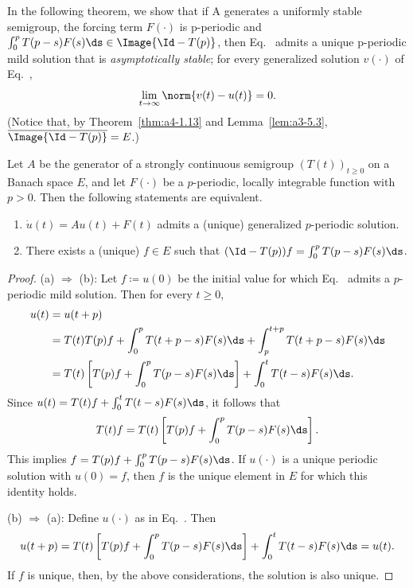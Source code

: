 In the following theorem, we show that if A generates a
uniformly stable semigroup, the forcing term $F(\cdot)$ is p-periodic
and $\int_{0}^{p} T(p-s)F(s)  \ds \in \Image{\Id - T(p)}$, then Eq.~
 admits a unique p-periodic mild solution that is \emph{asymptotically stable}; 
 \ie for every generalized solution $v(\cdot)$ of Eq.~, 
\[
\lim_{t \to \infty} \norm{v(t) - u(t)} = 0.
\]  
(Notice that, by
Theorem~\ref{thm:a4-1.13} and Lemma~\ref{lem:a3-5.3}, $\overline{ \Image{ \Id - T(p) } } = E $.)
\begin{lemma}\label{lem:a4-2.2}
Let $A$ be the generator of a strongly continuous semigroup $(T(t))_{t \geq 0}$ on a Banach space $E$, and let $F(\cdot)$ be a $p$-periodic, locally integrable function with $p > 0$. 
Then the following statements are equivalent.
\begin{enumerate}[\upshape (a)]
\item 
$\dot{u}(t) = Au(t) + F(t)$ admits a (unique) generalized $p$-periodic solution.

\item 
There exists a (unique) $f \in E$ such that $(\Id - T(p))f = \int_{0}^{p} T(p-s)F(s)  \ds$.
\end{enumerate}
\end{lemma}
\begin{proof}
(a) $\Rightarrow$ (b): 
Let $f \coloneqq u(0)$ be the initial value for which Eq.~ admits a $p$-periodic mild solution. 
Then for every $t\ge 0$,
\begin{align*}
u(t) &= u(t+p) \\
&= T(t)T(p)f + \int_{0}^{p} T(t+p-s)F(s)  \ds + \int_{p}^{t+p} T(t+p-s)F(s)  \ds \\
&= T(t)\left[T(p)f + \int_{0}^{p} T(p-s)F(s)  \ds\right] + \int_{0}^{t} T(t-s)F(s)  \ds.
\end{align*}
Since $u(t) = T(t)f+\int_0^t T(t-s)F(s)\ds$, it follows that
\[T(t)f = T(t)\left[T(p)f+\int_0^pT(p-s)F(s)\ds\right].\]
This implies $f = T(p)f + \int_{0}^{p} T(p-s)F(s)  \ds$.
If\/ $u(\cdot)$ is a unique periodic solution with $u(0) = f$, then $f$ is the unique element in $E$ for which this identity holds.

(b) $\Rightarrow$ (a):  
Define $u(\cdot)$ as in Eq.~. 
Then
\begin{align*}
u(t+p) = T(t)\left[T(p)f + \int_{0}^{p} T(p-s)F(s)  \ds\right] + \int_{0}^{t} T(t-s)F(s)  \ds = u(t).
\end{align*}
If\/ $f$ is unique, then, by the above considerations, the solution is also unique.
\end{proof}
